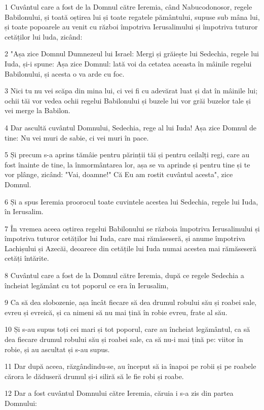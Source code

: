\par 1 Cuvântul care a fost de la Domnul către Ieremia, când Nabucodonosor, regele Babilonului, și toată oștirea lui și toate regatele pământului, supuse sub mâna lui, și toate popoarele au venit cu război împotriva Ierusalimului și împotriva tuturor cetăților lui luda, zicând:
\par 2 "Așa zice Domnul Dumnezeul lui Israel: Mergi și grăiește lui Sedechia, regele lui Iuda, și-i spune: Așa zice Domnul: lată voi da cetatea aceasta în mâinile regelui Babilonului, și acesta o va arde cu foc.
\par 3 Nici tu nu vei scăpa din mina lui, ci vei fi cu adevărat luat și dat în mâinile lui; ochii tăi vor vedea ochii regelui Babilonului și buzele lui vor grăi buzelor tale și vei merge la Babilon.
\par 4 Dar ascultă cuvântul Domnului, Sedechia, rege al lui Iuda! Așa zice Domnul de tine: Nu vei muri de sabie, ci vei muri în pace.
\par 5 Și precum s-a aprins tămâie pentru părinții tăi și pentru ceilalți regi, care au fost înainte de tine, la înmormântarea lor, așa se va aprinde și pentru tine și te vor plânge, zicând: "Vai, doamne!" Că Eu am rostit cuvântul acesta", zice Domnul.
\par 6 Și a spus Ieremia proorocul toate cuvintele acestea lui Sedechia, regele lui Iuda, în Ierusalim.
\par 7 În vremea aceea oștirea regelui Babilonului se războia împotriva Ierusalimului și împotriva tuturor cetăților lui Iuda, care mai rămăseseră, și anume împotriva Lachișului și Azecăi, deoarece din cetățile lui Iuda numai acestea mai rămăseseră cetăți întărite.
\par 8 Cuvântul care a fost de la Domnul către Ieremia, după ce regele Sedechia a încheiat legământ cu tot poporul ce era în Ierusalim,
\par 9 Ca să dea slobozenie, așa încât fiecare să dea drumul robului său și roabei sale, evreu și evreică, și ca nimeni să nu mai țină în robie evreu, frate al său.
\par 10 Și s-au supus toți cei mari și tot poporul, care au încheiat legământul, ca să dea fiecare drumul robului său și roabei sale, ca să nu-i mai țină pe: viitor în robie, și au ascultat și s-au supus.
\par 11 Dar după aceea, răzgândindu-se, au început să ia înapoi pe robii și pe roabele cărora le dăduseră drumul și-i siliră să le fie robi și roabe.
\par 12 Dar a fost cuvântul Domnului către Ieremia, căruia i s-a zis din partea Domnului:
